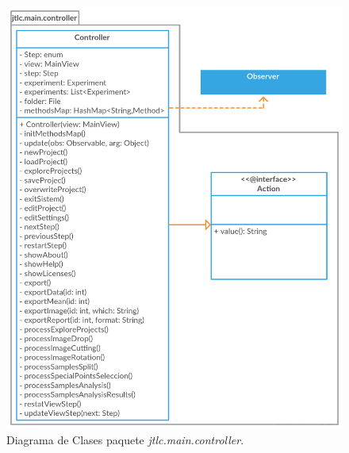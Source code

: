 \begin{figure}[H]
	\centering
	\vspace{-0.5cm}
	\includegraphics[width=425pt]{imagenes-jtlc/controller}
	\centering
	\vspace{-0.5cm}
	\caption{Diagrama de Clases paquete \textit{jtlc.main.controller}.}
	\label{fig:controllerDiagrama}
\end{figure}

